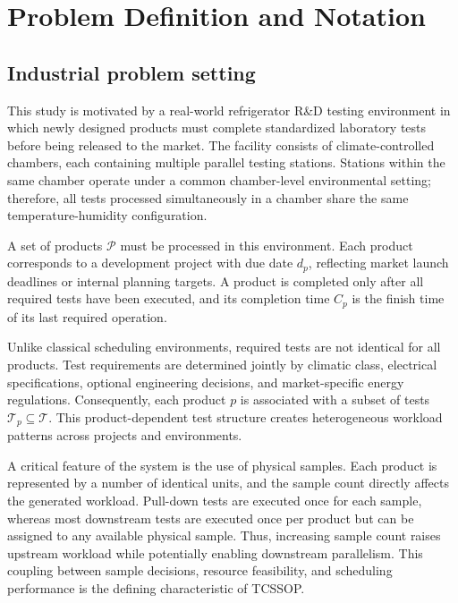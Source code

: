 \documentclass[11pt]{article}
\begin{document}
\section{Problem Definition and Notation}
\label{sec:pd}

\subsection{Industrial problem setting}
\label{subsec:industrial_setting}

This study is motivated by a real-world refrigerator R\&D testing environment in which newly designed products must complete standardized laboratory tests before being released to the market. The facility consists of climate-controlled chambers, each containing multiple parallel testing stations. Stations within the same chamber operate under a common chamber-level environmental setting; therefore, all tests processed simultaneously in a chamber share the same temperature-humidity configuration.

A set of products \(\mathcal{P}\) must be processed in this environment. Each product corresponds to a development project with due date \(d_p\), reflecting market launch deadlines or internal planning targets. A product is completed only after all required tests have been executed, and its completion time \(C_p\) is the finish time of its last required operation.

Unlike classical scheduling environments, required tests are not identical for all products. Test requirements are determined jointly by climatic class, electrical specifications, optional engineering decisions, and market-specific energy regulations. Consequently, each product \(p\) is associated with a subset of tests \(\mathcal{T}_p\subseteq\mathcal{T}\). This product-dependent test structure creates heterogeneous workload patterns across projects and environments.

A critical feature of the system is the use of physical samples. Each product is represented by a number of identical units, and the sample count directly affects the generated workload. Pull-down tests are executed once for each sample, whereas most downstream tests are executed once per product but can be assigned to any available physical sample. Thus, increasing sample count raises upstream workload while potentially enabling downstream parallelism. This coupling between sample decisions, resource feasibility, and scheduling performance is the defining characteristic of TCSSOP.
\end{document}
